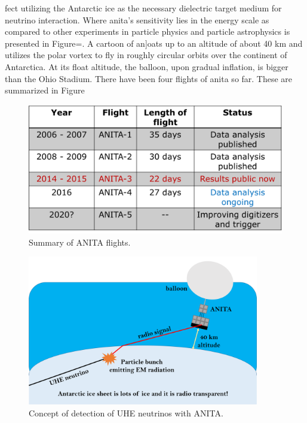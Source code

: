 fect utilizing the Antarctic ice as the necessary dielectric target medium for neutrino interaction. Where \gls{anita}'s sensitivity lies in the energy scale as compared to other experiments in particle physics and particle astrophysics is presented in Figure=. A cartoon of an]oats up to an altitude of about 40 km and utilizes the polar vortex to fly in roughly circular orbits over the continent of Antarctica. At its float altitude, the balloon, upon gradual inflation, is bigger than the Ohio Stadium. There have been four flights of \gls{anita} so far. These are summarized in Figure

\begin{figure}
\centering
\includegraphics[width=1.0\textwidth]{figures/flights_table.png}
\caption{Summary of ANITA flights.}
\label{flights_summary}
\end{figure}


\begin{figure}
\centering
\includegraphics[width=0.9\textwidth]{figures/anita_cartoon_updated.png}
\caption{Concept of detection of UHE neutrinos with ANITA.}
\label{anita_cartoon}
\end{figure}

